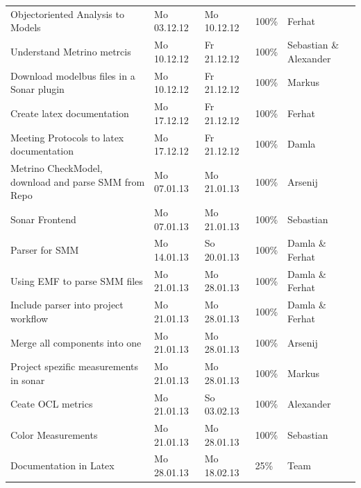 \begin{longtable}{|p{6cm}|p{2.5cm}|p{2.5cm}|p{1.7cm}|p{1.8cm}|}
Objectoriented Analysis to Models                                       & Mo 03.12.12 & Mo 10.12.12 & 100\%     & Ferhat                  \\ 
Understand Metrino metrcis                                              & Mo 10.12.12 & Fr 21.12.12 & 100\%     & Sebastian  \&  Alexander \\ 
Download modelbus files in a Sonar plugin                                & Mo 10.12.12 & Fr 21.12.12 & 100\%     & Markus                  \\ 
Create latex documentation                                              & Mo 17.12.12 & Fr 21.12.12 & 100\%     & Ferhat                  \\ 
Meeting Protocols to latex documentation                                & Mo 17.12.12 & Fr 21.12.12 & 100\%     & Damla                   \\ 
Metrino CheckModel, download and parse SMM from Repo                    & Mo 07.01.13 & Mo 21.01.13 & 100\%     & Arsenij                 \\ 
Sonar Frontend                                                          & Mo 07.01.13 & Mo 21.01.13 & 100\%     & Sebastian               \\ 
Parser for SMM                                                          & Mo 14.01.13 & So 20.01.13 & 100\%     & Damla  \&  Ferhat       \\ 
Using EMF to parse SMM files                                         & Mo 21.01.13 & Mo 28.01.13 & 100\%     & Damla  \&  Ferhat       \\
Include parser into project workflow                                    & Mo 21.01.13 & Mo 28.01.13 & 100\%     & Damla  \&  Ferhat       \\ 
Merge all components into one                                           & Mo 21.01.13 & Mo 28.01.13 & 100\%     & Arsenij                 \\ 
Project spezific measurements in sonar                                  & Mo 21.01.13 & Mo 28.01.13 & 100\%     & Markus                  \\ 
Ceate OCL metrics                                                       & Mo 21.01.13 & So 03.02.13 & 100\%     & Alexander               \\ 
Color Measurements                                                      & Mo 21.01.13 & Mo 28.01.13 & 100\%     & Sebastian               \\ 
Documentation in Latex                                                  & Mo 28.01.13 & Mo 18.02.13 & 25\%      & Team                    \\ 

\end{longtable}
